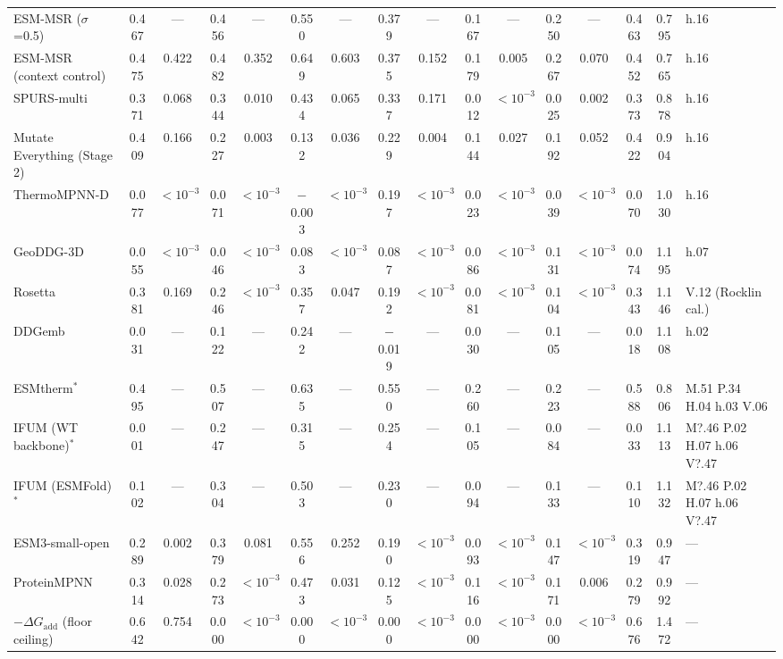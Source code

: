 \begin{table}[H]
{\begin{tabular}{lccccccccccccccl}
ESM-MSR ($\sigma$=0.5) & 0.467 & --- & 0.456 & --- & 0.550 & --- & 0.379 & --- & 0.167 & --- & 0.250 & --- & 0.463 & 0.795 & h.16 \\
ESM-MSR (context control) & 0.475 & 0.422 & 0.482 & 0.352 & 0.649 & 0.603 & 0.375 & 0.152 & 0.179 & 0.005 & 0.267 & 0.070 & 0.452 & 0.765 & h.16 \\
SPURS-multi & 0.371 & 0.068 & 0.344 & 0.010 & 0.434 & 0.065 & 0.337 & 0.171 & 0.012 & $<10^{-3}$ & 0.025 & 0.002 & 0.373 & 0.878 & h.16 \\
Mutate Everything (Stage 2) & 0.409 & 0.166 & 0.227 & 0.003 & 0.132 & 0.036 & 0.229 & 0.004 & 0.144 & 0.027 & 0.192 & 0.052 & 0.422 & 0.904 & h.16 \\
ThermoMPNN-D & 0.077 & $<10^{-3}$ & 0.071 & $<10^{-3}$ & $-$0.003 & $<10^{-3}$ & 0.197 & $<10^{-3}$ & 0.023 & $<10^{-3}$ & 0.039 & $<10^{-3}$ & 0.070 & 1.030 & h.16 \\
GeoDDG-3D & 0.055 & $<10^{-3}$ & 0.046 & $<10^{-3}$ & 0.083 & $<10^{-3}$ & 0.087 & $<10^{-3}$ & 0.086 & $<10^{-3}$ & 0.131 & $<10^{-3}$ & 0.074 & 1.195 & h.07 \\
Rosetta & 0.381 & 0.169 & 0.246 & $<10^{-3}$ & 0.357 & 0.047 & 0.192 & $<10^{-3}$ & 0.081 & $<10^{-3}$ & 0.104 & $<10^{-3}$ & 0.343 & 1.146 & V.12 (Rocklin cal.) \\
DDGemb & 0.031 & --- & 0.122 & --- & 0.242 & --- & $-$0.019 & --- & 0.030 & --- & 0.105 & --- & 0.018 & 1.108 & h.02 \\
ESMtherm$^*$ & 0.495 & --- & 0.507 & --- & 0.635 & --- & 0.550 & --- & 0.260 & --- & 0.223 & --- & 0.588 & 0.806 & M.51 P.34 H.04 h.03 V.06 \\
IFUM (WT backbone)$^*$ & 0.001 & --- & 0.247 & --- & 0.315 & --- & 0.254 & --- & 0.105 & --- & 0.084 & --- & 0.033 & 1.113 & M?.46 P.02 H.07 h.06 V?.47 \\
IFUM (ESMFold)$^*$ & 0.102 & --- & 0.304 & --- & 0.503 & --- & 0.230 & --- & 0.094 & --- & 0.133 & --- & 0.110 & 1.132 & M?.46 P.02 H.07 h.06 V?.47 \\
ESM3-small-open & 0.289 & 0.002 & 0.379 & 0.081 & 0.556 & 0.252 & 0.190 & $<10^{-3}$ & 0.093 & $<10^{-3}$ & 0.147 & $<10^{-3}$ & 0.319 & 0.947 & --- \\
ProteinMPNN & 0.314 & 0.028 & 0.273 & $<10^{-3}$ & 0.473 & 0.031 & 0.125 & $<10^{-3}$ & 0.116 & $<10^{-3}$ & 0.171 & 0.006 & 0.279 & 0.992 & --- \\
$-\Delta G_{\mathrm{add}}$ (floor ceiling) & 0.642 & 0.754 & 0.000 & $<10^{-3}$ & 0.000 & $<10^{-3}$ & 0.000 & $<10^{-3}$ & 0.000 & $<10^{-3}$ & 0.000 & $<10^{-3}$ & 0.676 & 1.472 & --- \\
\bottomrule
\end{tabular}
}
\end{table}

